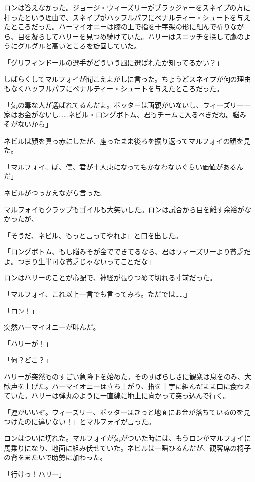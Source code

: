 \documentclass[10pt,a4paper]{article}
\begin{document}
\begin{CJK}{UTF8}{min}
ロンは答えなかった。ジョージ・ウィーズリーがブラッジャーをスネイプの方に打ったという理由で、スネイプがハッフルパフにべナルティー・シュートを与えたところだった。ハーマイオニーは膝の上で指を十字架の形に組んで祈りながら、目を凝らしてハリーを見つめ続けていた。ハリーはスニッチを探して鷹のようにグルグルと高いところを旋回していた。

「グリフィンドールの選手がどういう風に選ばれたか知ってるかい？」

しばらくしてマルフォイが聞こえよがしに言った。ちょうどスネイプが何の理由もなくハッフルパフにペナルティー・シュートを与えたところだった。

「気の毒な人が選ばれてるんだよ。ポッターは両親がいないし、ウィーズリー一家はお金がないし……ネビル・ロングボトム、君もチームに入るべきだね。脳みそがないから」

ネビルは顔を真っ赤にしたが、座ったまま後ろを振り返ってマルフォイの顔を見た。

「マルフォイ、ぼ、僕、君が十人束になってもかなわないぐらい価値があるんだ」

ネビルがつっかえながら言った。

マルフォイもクラップもゴイルも大笑いした。ロンは試合から目を離す余裕がなかったが、

「そうだ、ネビル、もっと言ってやれよ」と口を出した。

「ロングボトム、もし脳みそが金でできてるなら、君はウィーズリーより貧乏だよ。つまり生半可な貧乏じゃないってことだな」

ロンはハリーのことが心配で、神経が張りつめて切れる寸前だった。

「マルフォイ、これ以上一言でも言ってみろ。ただでは……」

「ロン！」

突然ハーマイオニーが叫んだ。

「ハリーが！」

「何？どこ？」

ハリーが突然ものすごい急降下を始めた。そのすばらしさに観衆は息をのみ、大歓声を上げた。ハーマイオニーは立ち上がり、指を十字に組んだまま口に食わえていた。ハリーは弾丸のように一直線に地上に向かって突っ込んで行く。

「運がいいぞ。ウィーズリー、ポッターはきっと地面にお金が落ちているのを見つけたのに違いない！」とマルフォイが言った。

ロンはついに切れた。マルフォイが気がついた時には、もうロンがマルフォイに馬乗りになり、地面に組み伏せていた。ネビルは一瞬ひるんだが、観客席の椅子の背をまたいで助勢に加わった。

「行けっ！ハリー」


\end{CJK}
\end{document}
